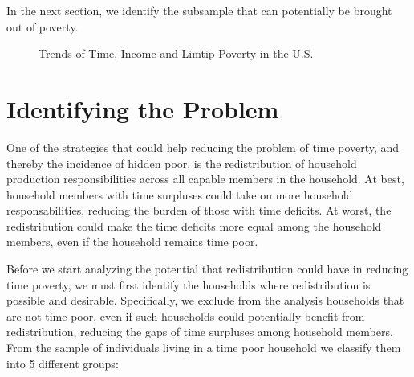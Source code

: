 \documentclass[
  11pt,
]{article}
\begin{document}
In the next section, we identify the subsample that can potentially be
brought out of poverty.

\begin{figure}


\caption{\label{fig-trend}Trends of Time, Income and Limtip Poverty in
the U.S.}

\end{figure}%

\section{Identifying the Problem}\label{sec-problem}

One of the strategies that could help reducing the problem of time
poverty, and thereby the incidence of hidden poor, is the redistribution
of household production responsibilities across all capable members in
the household. At best, household members with time surpluses could take
on more household responsabilities, reducing the burden of those with
time deficits. At worst, the redistribution could make the time deficits
more equal among the household members, even if the household remains
time poor.

Before we start analyzing the potential that redistribution could have
in reducing time poverty, we must first identify the households where
redistribution is possible and desirable. Specifically, we exclude from
the analysis households that are not time poor, even if such households
could potentially benefit from redistribution, reducing the gaps of time
surpluses among household members. From the sample of individuals living
in a time poor household we classify them into 5 different groups:
\end{document}
